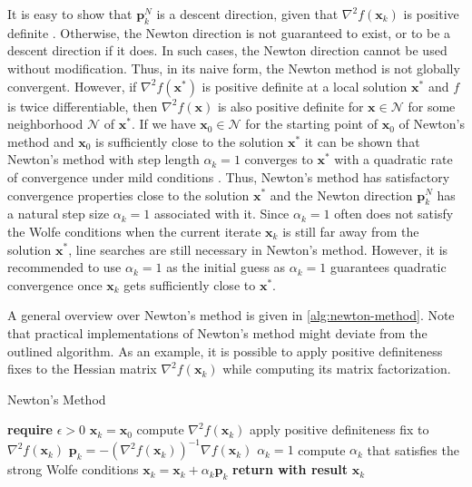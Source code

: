 It is easy to show that $\bm{p}^N_k$ is a descent direction, given that $\nabla^2 f(\bm{x}_k)$ is positive definite \cite{nocedal2006}. 
Otherwise, the Newton direction is not guaranteed to exist, or to be a descent direction if it does. In such cases, the Newton direction cannot 
be used without modification. Thus, in its naive form, the Newton method is not globally convergent. However, if $\nabla^2 f(\bm{x}^*)$ is positive
definite at a local solution $\bm{x}^*$ and $f$ is twice differentiable, then $\nabla^2 f(\bm{x})$ is also positive definite for $\bm{x} \in 
\mathcal{N}$ for some neighborhood $\mathcal{N}$ of $\bm{x}^*$. If we have $\bm{x}_0 \in \mathcal{N}$ for the starting point of $\bm{x}_0$
of Newton's method and $\bm{x}_0$ is sufficiently close to the solution $\bm{x}^*$ it can be shown that Newton's method with step length
$\alpha_k = 1$ converges to $\bm{x}^*$ with a quadratic rate of convergence under mild conditions \cite{nocedal2006}. Thus, Newton's method 
has satisfactory convergence properties close to the solution $\bm{x}^*$ and the Newton direction $\bm{p}^N_k$ has a natural step size 
$\alpha_k = 1$ associated with it. Since $\alpha_k = 1$ often does not satisfy the Wolfe conditions when the current iterate $\bm{x}_k$ is still 
far away from the solution $\bm{x}^*$, line searches are still necessary in Newton's method. However, it is recommended to use $\alpha_k = 1$ as the
initial guess as $\alpha_k = 1$ guarantees quadratic convergence once $\bm{x}_k$ gets sufficiently close to $\bm{x}^*$.

A general overview over Newton's method is given in \cref{alg:newton-method}. Note that practical implementations of Newton's method might deviate
from the outlined algorithm. As an example, it is possible to apply positive definiteness fixes to the Hessian matrix $\nabla^2 f(\bm{x}_k)$
while computing its matrix factorization. 

\begin{algorithm}
\caption{Newton's Method}\label{alg:newton-method}
\begin{algorithmic}
\State \textbf{require } $\epsilon > 0$
\State $\bm{x}_k = \bm{x}_0$
\State compute $\nabla^2 f(\bm{x}_k)$
\State apply positive definiteness fix to $\nabla^2 f(\bm{x}_k)$
\EndIf
\State $\bm{p}_k = -(\nabla^2 f(\bm{x}_k))^{-1} \nabla f(\bm{x}_k)$
\State $\alpha_k = 1$
\State compute $\alpha_k$ that satisfies the strong Wolfe conditions
\EndIf
\State $\bm{x}_k = \bm{x}_k + \alpha_k \bm{p}_k$
\EndWhile
\State \textbf{return with result } $\bm{x}_k$
\EndProcedure
\end{algorithmic}
\end{algorithm}

